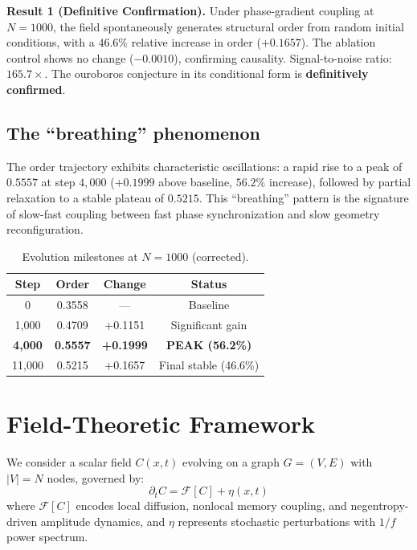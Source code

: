 \documentclass[11pt,a4paper]{article}
\theoremstyle{plain}
\theoremstyle{definition}
\begin{document}
\begin{keybox}
\textbf{Result 1 (Definitive Confirmation).}
Under phase-gradient coupling at $N = 1000$, the field spontaneously
generates structural order from random initial conditions, with a
$46.6\%$ relative increase in order ($+0.1657$). The ablation control
shows no change ($-0.0010$), confirming causality. Signal-to-noise ratio:
$165.7\times$. The ouroboros conjecture in its conditional form is
\textbf{definitively confirmed}.
\end{keybox}

\subsection{The ``breathing'' phenomenon}

The order trajectory exhibits characteristic oscillations:
a rapid rise to a peak of $0.5557$ at step $4{,}000$ ($+0.1999$ above
baseline, $56.2\%$ increase), followed by partial relaxation to a
stable plateau of $0.5215$. This ``breathing'' pattern is the signature
of slow-fast coupling between fast phase synchronization and slow
geometry reconfiguration.

\begin{table}[h]
\centering
\caption{Evolution milestones at $N=1000$ (corrected).}
\label{tab:milestones}
\begin{tabular}{cccc}
\toprule
\textbf{Step} & \textbf{Order} & \textbf{Change} & \textbf{Status} \\
\midrule
0              & 0.3558          & ---             & Baseline \\
1{,}000        & 0.4709          & +0.1151         & Significant gain \\
\textbf{4{,}000}& \textbf{0.5557} & \textbf{+0.1999}& \textbf{PEAK (56.2\%)} \\
11{,}000       & 0.5215          & +0.1657         & Final stable (46.6\%) \\
\bottomrule
\end{tabular}
\end{table}

\section{Field-Theoretic Framework}
\label{sec:framework}

We consider a scalar field $C(x,t)$ evolving on a graph $G = (V,E)$
with $|V| = N$ nodes, governed by:
\begin{equation}
\label{eq:field}
\partial_t C = \mathcal{F}[C] + \eta(x,t)
\end{equation}
where $\mathcal{F}[C]$ encodes local diffusion, nonlocal memory coupling,
and negentropy-driven amplitude dynamics, and $\eta$ represents stochastic
perturbations with $1/f$ power spectrum.
\end{document}
